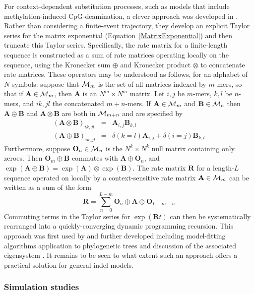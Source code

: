 \documentclass{bmcart}
\newcommand{\matr}[1]{\mathbf{#1}}
\newcommand{\eqref}[1]{Equation~\ref{#1}}
\newcommand{\ratematrix}{\matr{R}}
\begin{document}
For context-dependent substitution processes,
such as models that include methylation-induced CpG-deamination,
a clever approach was developed in \cite{LunterHein04}.
Rather than considering a finite-event trajectory, they develop an explicit Taylor series for the matrix exponential
(\eqref{MatrixExponential}) and then truncate this Taylor series.
\color{red}
Specifically, the rate matrix for a finite-length sequence is constructed
as a sum of rate matrices operating locally on the sequence, using the Kronecker sum $\oplus$
and Kronecker product $\otimes$ to concatenate rate matrices.
These operators may be understood as follows, for an alphabet of $N$ symbols:
suppose that ${\cal M}_m$ is the set of all matrices indexed by $m$-mers,
so that if $\matr{A} \in {\cal M}_m$, then $\matr{A}$ is an $N^m \times N^m$ matrix.
Let $i,j$ be $m$-mers, $k,l$ be $n$-mers, and $ik, jl$ the concatenated $m+n$-mers.
If $\matr{A} \in {\cal M}_m$ and $\matr{B} \in {\cal M}_n$
then $\matr{A} \oplus \matr{B}$ and $\matr{A} \otimes \matr{B}$ are both in ${\cal M}_{m+n}$
and are specified by
\begin{eqnarray}
  \left( \matr{A} \otimes \matr{B} \right)_{ik,jl} & = & \matr{A}_{i,j} \matr{B}_{k,l} \\
  \left( \matr{A} \oplus \matr{B} \right)_{ik,jl} & = & \delta(k=l) \matr{A}_{i,j} + \delta(i=j) \matr{B}_{k,l}
\end{eqnarray}
Furthermore, suppose $\matr{O}_n \in {\cal M}_n$ is the $N^k \times N^k$ null matrix containing only zeroes.
Then $\matr{O}_m \oplus \matr{B}$ commutes with $\matr{A} \oplus \matr{O}_n$,
and $\exp(\matr{A} \oplus \matr{B}) = \exp(\matr{A}) \otimes \exp(\matr{B})$.
The rate matrix $\ratematrix$ for a length-$L$ sequence operated on locally by a context-sensitive rate matrix $\matr{A} \in {\cal M}_m$ can be written as a sum of the form
\[
\ratematrix = \sum_{n=0}^{L-m} \matr{O}_n \oplus \matr{A} \oplus \matr{O}_{L-m-n}
\]
Commuting terms in the Taylor series for $\exp(\ratematrix t)$ can then be systematically rearranged into a quickly-converging dynamic programming recursion.
This approach was first used by \cite{LunterHein04} and further developed
including model-fitting algorithms \cite{Hobolth2008}
application to phylogenetic trees \cite{BerardGueguen2012}
and discussion of the associated eigensystem \cite{pmid21827770,pmid26135206}.
\color{black}
It remains to be seen to what extent such an approach offers a practical solution for general indel models.

\subsubsection*{Simulation studies}
\end{document}
